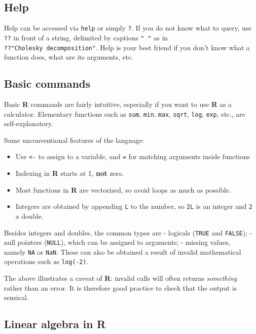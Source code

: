 \documentclass[]{book}
\providecommand{\tightlist}{%
  \setlength{\itemsep}{0pt}\setlength{\parskip}{0pt}}
\theoremstyle{definition}
\theoremstyle{definition}
\theoremstyle{definition}
\theoremstyle{remark}
\begin{document}
\subsection{Help}\label{help}

Help can be accessed via \texttt{help} or simply \texttt{?}. If you do
not know what to query, use \texttt{??} in front of a string, delimited
by captions \texttt{"\ "} as in \texttt{??"Cholesky\ decomposition"}.
Help is your best friend if you don't know what a function does, what
are its arguments, etc.

\subsection{Basic commands}\label{basic-commands}

Basic \textbf{R} commands are fairly intuitive, especially if you want
to use \textbf{R} as a calculator. Elementary functions such as
\texttt{sum}, \texttt{min}, \texttt{max}, \texttt{sqrt}, \texttt{log},
\texttt{exp}, etc., are self-explanatory.

Some unconventional features of the language:

\begin{itemize}
\tightlist
\item
  Use \texttt{\textless{}-} to assign to a variable, and \texttt{=} for
  matching arguments inside functions
\item
  Indexing in \textbf{R} starts at 1, \textbf{not} zero.
\item
  Most functions in \textbf{R} are vectorized, so avoid loops as much as
  possible.
\item
  Integers are obtained by appending \texttt{L} to the number, so
  \texttt{2L} is an integer and \texttt{2} a double.
\end{itemize}

Besides integers and doubles, the common types are - logicals
(\texttt{TRUE} and \texttt{FALSE}); - null pointers (\texttt{NULL}),
which can be assigned to arguments; - missing values, namely \texttt{NA}
or \texttt{NaN}. These can also be obtained a result of invalid
mathematical operations such as \texttt{log(-2)}.

The above illustrates a caveat of \textbf{R}: invalid calls will often
returns \emph{something} rather than an error. It is therefore good
practice to check that the output is sensical.

\subsection{\texorpdfstring{Linear algebra in
\textbf{R}}{Linear algebra in R}}\label{linear-algebra-in-r}
\end{document}
